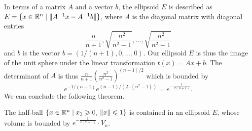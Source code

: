 In terms of a matrix $A$ and a vector $b$, the ellipsoid $E$ is
described as $E = \{ x \in \mathbb{R}^n \mid \| A^{-1} x - A^{-1}b\|\}$, where $A$
is the diagonal matrix with diagonal  entries
\begin{displaymath}
  \frac{n}{n+1},\sqrt{\frac{n^2}{n^2-1}},\ldots,\sqrt{\frac{n^2}{n^2-1}}
\end{displaymath}
and $b$ is the vector $b = (1/(n+1),0,\ldots,0)$. Our ellipsoid $E$ is thus
the image of the unit sphere under the linear transformation
$t(x)=Ax+b$. 
The determinant of $A$ 
is thus $\frac{n}{n+1}\left(\frac{n^2}{n^2-1}\right)^{(n-1)/2}$ which is
bounded by 
\begin{equation}
  \label{el:eq:19}
  e^{-1/(n+1)} e^{(n-1)/(2\cdot (n^2-1))} = e^{-\frac{1}{2(n+1)}}.  
\end{equation}
%
We can conclude the following theorem.
\begin{theorem}
  \label{el:thr:19}
  The half-ball $\{ x \in \mathbb{R}^n \mid x_1\geqslant0, \, \|x\|\leqslant1\}$ is contained in an
  ellipsoid $E$, whose volume is bounded by $ e^{-\frac{1}{2(n+1)}} \cdot
  V_n$. 
\end{theorem}
%


